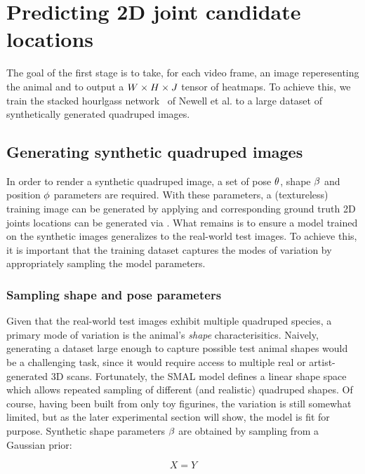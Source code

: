 
\section{Predicting 2D joint candidate locations}

The goal of the first stage is to take, for each video frame, an image reperesenting the animal and to output a $W \times H \times J$ tensor of heatmaps. To achieve this, we train the stacked hourlgass network~\cite{newell2016stacked} of Newell et al. to a large dataset of synthetically generated quadruped images. 

\subsection{Generating synthetic quadruped images}

In order to render a synthetic quadruped image, a set of pose $\theta$, shape $\beta$ and position $\phi$ parameters are required. With these parameters, a (textureless) training image can be generated by applying  and corresponding ground truth 2D joints locations can be generated via . What remains is to ensure a model trained on the synthetic images generalizes to the real-world test images. To achieve this, it is important that the training dataset captures the modes of variation by appropriately sampling the model parameters. 

\subsubsection{Sampling shape and pose parameters}

Given that the real-world test images exhibit multiple quadruped species, a primary mode of variation is the animal's \emph{shape} characterisitics. Naively, generating a dataset large enough to capture possible test animal shapes would be a challenging task, since it would require access to multiple real or artist-generated 3D scans. Fortunately, the SMAL model defines a linear shape space which allows repeated sampling of different (and realistic) quadruped shapes. Of course, having been built from only toy figurines, the variation is still somewhat limited, but as the later experimental section will show, the model is fit for purpose. Synthetic shape parameters $\beta$ are obtained by sampling from a Gaussian prior:

\begin{equation}\label{eq:sampling_shape}
X = Y
\end{equation}

